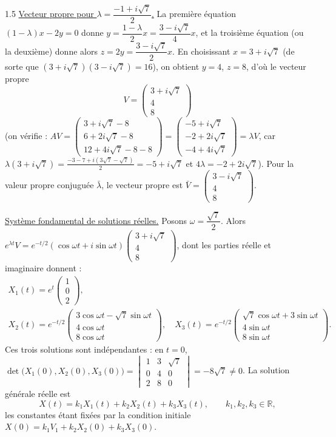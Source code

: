 \documentclass[12pt]{article}
\begin{document}
\begin{spacing}{1.5}
\underline{Vecteur propre pour $\lambda=\dfrac{-1+i\sqrt7}{2}$.} La première équation $(1-\lambda)x-2y=0$ donne $y=\dfrac{1-\lambda}{2}x=\dfrac{3-i\sqrt7}{4}x$, et la troisième équation (ou la deuxième) donne alors $z=2y=\dfrac{3-i\sqrt7}{2}x$. En choisissant $x=3+i\sqrt7$ (de sorte que $(3+i\sqrt7)(3-i\sqrt7)=16$), on obtient $y=4$, $z=8$, d'où le vecteur propre
\[
V=\begin{pmatrix}3+i\sqrt7\\4\\8\end{pmatrix}
\]
(on vérifie : $AV=\begin{pmatrix}3+i\sqrt7-8\\6+2i\sqrt7-8\\12+4i\sqrt7-8-8\end{pmatrix}=\begin{pmatrix}-5+i\sqrt7\\-2+2i\sqrt7\\-4+4i\sqrt7\end{pmatrix}=\lambda V$, car $\lambda(3+i\sqrt7)=\frac{-3-7+i(3\sqrt7-\sqrt7)}{2}=-5+i\sqrt7$ et $4\lambda=-2+2i\sqrt7$).
Pour la valeur propre conjuguée $\bar\lambda$, le vecteur propre est $\bar V=\begin{pmatrix}3-i\sqrt7\\4\\8\end{pmatrix}$.

\underline{Système fondamental de solutions réelles.} Posons $\omega=\dfrac{\sqrt7}{2}$. Alors $e^{\lambda t}V=e^{-t/2}(\cos\omega t+i\sin\omega t)\begin{pmatrix}3+i\sqrt7\\4\\8\end{pmatrix}$, dont les parties réelle et imaginaire donnent :
\begin{gather*}
X_1(t)=e^{t}\begin{pmatrix}1\\0\\2\end{pmatrix},\\
X_2(t)=e^{-t/2}\begin{pmatrix}3\cos\omega t-\sqrt7\sin\omega t\\4\cos\omega t\\8\cos\omega t\end{pmatrix},\quad
X_3(t)=e^{-t/2}\begin{pmatrix}\sqrt7\cos\omega t+3\sin\omega t\\4\sin\omega t\\8\sin\omega t\end{pmatrix}.
\end{gather*}
Ces trois solutions sont indépendantes : en $t=0$, $\det\big(X_1(0),X_2(0),X_3(0)\big)=\begin{vmatrix}1&3&\sqrt7\\0&4&0\\2&8&0\end{vmatrix}=-8\sqrt7\neq0$.
La solution générale réelle est
\[
X(t)=k_1X_1(t)+k_2X_2(t)+k_3X_3(t),\qquad k_1,k_2,k_3\in\mathbb{R},
\]
les constantes étant fixées par la condition initiale $X(0)=k_1V_1+k_2X_2(0)+k_3X_3(0)$.


\end{spacing}
\end{document}
